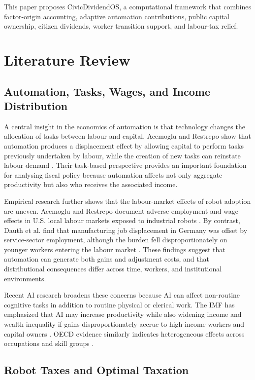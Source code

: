 \documentclass[conference]{IEEEtran}
\begin{document}
This paper proposes CivicDividendOS, a computational framework that combines
factor-origin accounting, adaptive automation contributions, public capital
ownership, citizen dividends, worker transition support, and labour-tax relief.

\section{Literature Review}

\subsection{Automation, Tasks, Wages, and Income Distribution}

A central insight in the economics of automation is that technology changes the
allocation of tasks between labour and capital. Acemoglu and Restrepo show that
automation produces a displacement effect by allowing capital to perform tasks
previously undertaken by labour, while the creation of new tasks can reinstate
labour demand \cite{AcemogluRestrepo2019}. Their task-based perspective provides
an important foundation for analysing fiscal policy because automation affects
not only aggregate productivity but also who receives the associated income.

Empirical research further shows that the labour-market effects of robot
adoption are uneven. Acemoglu and Restrepo document adverse employment and wage
effects in U.S. local labour markets exposed to industrial robots
\cite{AcemogluRestrepo2020}. By contrast, Dauth et al. find that manufacturing
job displacement in Germany was offset by service-sector employment, although
the burden fell disproportionately on younger workers entering the labour market
\cite{Dauth2021}. These findings suggest that automation can generate both gains
and adjustment costs, and that distributional consequences differ across time,
workers, and institutional environments.

Recent AI research broadens these concerns because AI can affect non-routine
cognitive tasks in addition to routine physical or clerical work. The IMF has
emphasized that AI may increase productivity while also widening income and
wealth inequality if gains disproportionately accrue to high-income workers and
capital owners \cite{IMF2024AI}. OECD evidence similarly indicates heterogeneous
effects across occupations and skill groups \cite{OECD2025Korea}.

\subsection{Robot Taxes and Optimal Taxation}
\end{document}
